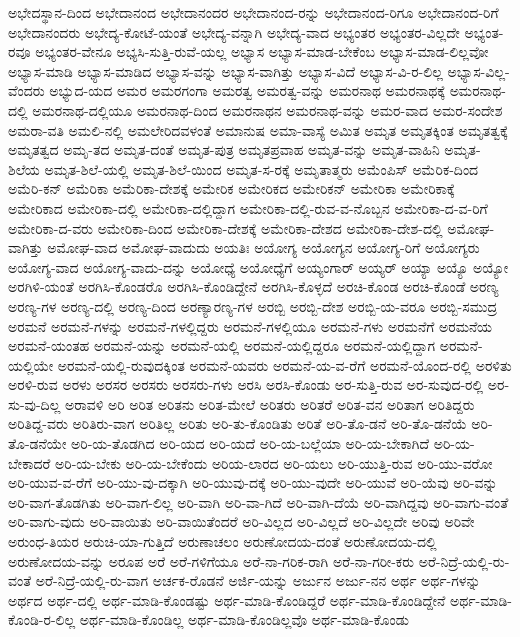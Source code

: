 {ಅಭೇದಸ್ಥಾನ-ದಿಂದ
ಅಭೇದಾನಂದ
ಅಭೇದಾನಂದರ
ಅಭೇದಾನಂದ-ರನ್ನು
ಅಭೇದಾನಂದ-ರಿಗೂ
ಅಭೇದಾನಂದ-ರಿಗೆ
ಅಭೇದಾನಂದರು
ಅಭೇದ್ಯ-ಕೋಟೆ-ಯಂತೆ
ಅಭೇದ್ಯ-ವನ್ನಾಗಿ
ಅಭೇದ್ಯ-ವಾದ
ಅಭ್ಯಂತರ
ಅಭ್ಯಂತರ-ವಿಲ್ಲದೇ
ಅಭ್ಯಂತ-ರವೂ
ಅಭ್ಯಂತರ-ವೇನೂ
ಅಭ್ಯಸಿ-ಸುತ್ತಿ-ರುವೆ-ಯಲ್ಲ
ಅಭ್ಯಾಸ
ಅಭ್ಯಾಸ-ಮಾಡ-ಬೇಕೆಂಬ
ಅಭ್ಯಾಸ-ಮಾಡ-ಲಿಲ್ಲವೋ
ಅಭ್ಯಾಸ-ಮಾಡಿ
ಅಭ್ಯಾಸ-ಮಾಡಿದ
ಅಭ್ಯಾಸ-ವನ್ನು
ಅಭ್ಯಾಸ-ವಾಗಿತ್ತು
ಅಭ್ಯಾಸ-ವಿದೆ
ಅಭ್ಯಾಸ-ವಿ-ರ-ಲಿಲ್ಲ
ಅಭ್ಯಾಸ-ವಿಲ್ಲ-ವೆಂದರು
ಅಭ್ಯುದ-ಯದ
ಅಮರ
ಅಮರಗಂಗಾ
ಅಮರತ್ವ
ಅಮರತ್ವ-ವನ್ನು
ಅಮರನಾಥ
ಅಮರನಾಥಕ್ಕೆ
ಅಮರನಾಥ-ದಲ್ಲಿ
ಅಮರನಾಥ-ದಲ್ಲಿಯೂ
ಅಮರನಾಥ-ದಿಂದ
ಅಮರನಾಥನ
ಅಮರನಾಥ-ವನ್ನು
ಅಮರ-ವಾದ
ಅಮರ-ಸಂದೇಶ
ಅಮರಾ-ವತಿ
ಅಮಲಿ-ನಲ್ಲಿ
ಅಮಲೇರಿದವಳಂತೆ
ಅಮಾನುಷ
ಅಮಾ-ವಾಸ್ಯೆ
ಅಮಿತ
ಅಮೃತ
ಅಮೃತಕ್ಕಿಂತ
ಅಮೃತತ್ವಕ್ಕೆ
ಅಮೃತತ್ವದ
ಅಮೃ-ತದ
ಅಮೃತ-ದಂತೆ
ಅಮೃತ-ಪುತ್ರ
ಅಮೃತಪ್ರವಾಹ
ಅಮೃತ-ವನ್ನು
ಅಮೃತ-ವಾಹಿನಿ
ಅಮೃತ-ಶಿಲೆಯ
ಅಮೃತ-ಶಿಲೆ-ಯಲ್ಲಿ
ಅಮೃತ-ಶಿಲೆ-ಯಿಂದ
ಅಮೃತ-ಸ-ರಕ್ಕೆ
ಅಮೃತಾತ್ಮರು
ಅಮೆಂಪಿಸ್
ಅಮೆರಿಕ-ದಿಂದ
ಅಮೆರಿ-ಕನ್
ಅಮೆರಿಕಾ
ಅಮೆರಿಕಾ-ದೇಶಕ್ಕೆ
ಅಮೇರಿಕ
ಅಮೇರಿಕದ
ಅಮೇರಿಕನ್
ಅಮೇರಿಕಾ
ಅಮೇರಿಕಾಕ್ಕೆ
ಅಮೇರಿಕಾದ
ಅಮೇರಿಕಾ-ದಲ್ಲಿ
ಅಮೇರಿಕಾ-ದಲ್ಲಿದ್ದಾಗ
ಅಮೇರಿಕಾ-ದಲ್ಲಿ-ರುವ-ವ-ನೊಬ್ಬನ
ಅಮೇರಿಕಾ-ದ-ವ-ರಿಗೆ
ಅಮೇರಿಕಾ-ದ-ವರು
ಅಮೇರಿಕಾ-ದಿಂದ
ಅಮೇರಿಕಾ-ದೇಶಕ್ಕೆ
ಅಮೇರಿಕಾ-ದೇಶದ
ಅಮೇರಿಕಾ-ದೇಶ-ದಲ್ಲಿ
ಅಮೋಘ-ವಾಗಿತ್ತು
ಅಮೋಘ-ವಾದ
ಅಮೋಘ-ವಾದುದು
ಅಯತಿಃ
ಅಯೋಗ್ಯ
ಅಯೋಗ್ಯನ
ಅಯೋಗ್ಯ-ರಿಗೆ
ಅಯೋಗ್ಯರು
ಅಯೋಗ್ಯ-ವಾದ
ಅಯೋಗ್ಯ-ವಾದು-ದನ್ನು
ಅಯೋಧ್ಯೆ
ಅಯೋಧ್ಯೆಗೆ
ಅಯ್ಯಂಗಾರ್
ಅಯ್ಯರ್
ಅಯ್ಯಾ
ಅಯ್ಯೊ
ಅಯ್ಯೋ
ಅರಗಿಳಿ-ಯಂತೆ
ಅರಗಿಸಿ-ಕೊಂಡರೊ
ಅರಗಿಸಿ-ಕೊಂಡಿದ್ದೇನೆ
ಅರಗಿಸಿ-ಕೊಳ್ಳದೆ
ಅರಚಿ-ಕೊಂಡ
ಅರಚಿ-ಕೊಂಡೆ
ಅರಣ್ಯ
ಅರಣ್ಯ-ಗಳ
ಅರಣ್ಯ-ದಲ್ಲಿ
ಅರಣ್ಯ-ದಿಂದ
ಅರಣ್ಯಾರಣ್ಯ-ಗಳ
ಅರಬ್ಬಿ
ಅರಬ್ಬಿ-ದೇಶ
ಅರಬ್ಬಿ-ಯ-ವರೂ
ಅರಬ್ಬಿ-ಸಮುದ್ರ
ಅರಮನೆ
ಅರಮನೆ-ಗಳನ್ನು
ಅರಮನೆ-ಗಳಲ್ಲಿದ್ದರು
ಅರಮನೆ-ಗಳಲ್ಲಿಯೂ
ಅರಮನೆ-ಗಳು
ಅರಮನೆಗೆ
ಅರಮನೆಯ
ಅರಮನೆ-ಯಂತಹ
ಅರಮನೆ-ಯನ್ನು
ಅರಮನೆ-ಯಲ್ಲಿ
ಅರಮನೆ-ಯಲ್ಲಿದ್ದರೂ
ಅರಮನೆ-ಯಲ್ಲಿದ್ದಾಗ
ಅರಮನೆ-ಯಲ್ಲಿಯೇ
ಅರಮನೆ-ಯಲ್ಲಿ-ರುವುದಕ್ಕಿಂತ
ಅರಮನೆ-ಯವರು
ಅರಮನೆ-ಯ-ವ-ರೆಗೆ
ಅರಮನೆ-ಯೊಂದ-ರಲ್ಲಿ
ಅರಳಿತು
ಅರಳಿ-ರುವ
ಅರಳು
ಅರಸರ
ಅರಸರು
ಅರಸರು-ಗಳು
ಅರಸಿ
ಅರಸಿ-ಕೊಂಡು
ಅರ-ಸುತ್ತಿ-ರುವ
ಅರ-ಸುವುದ-ರಲ್ಲಿ
ಅರ-ಸು-ವು-ದಿಲ್ಲ
ಅರಾವಳಿ
ಅರಿ
ಅರಿತ
ಅರಿತನು
ಅರಿತ-ಮೇಲೆ
ಅರಿತರು
ಅರಿತರೆ
ಅರಿತ-ವನ
ಅರಿತಾಗ
ಅರಿತಿದ್ದರು
ಅರಿತಿದ್ದ-ವರು
ಅರಿತಿರು-ವಾಗ
ಅರಿತಿಲ್ಲ
ಅರಿತು
ಅರಿ-ತು-ಕೊಂಡಿತು
ಅರಿತೆ
ಅರಿ-ತೊ-ಡನೆ
ಅರಿ-ತೊ-ಡನೆಯೆ
ಅರಿ-ತೊ-ಡನೆಯೇ
ಅರಿ-ಯ-ತೊಡಗಿದ
ಅರಿ-ಯದ
ಅರಿ-ಯದೆ
ಅರಿ-ಯ-ಬಲ್ಲೆಯಾ
ಅರಿ-ಯ-ಬೇಕಾಗಿದೆ
ಅರಿ-ಯ-ಬೇಕಾದರೆ
ಅರಿ-ಯ-ಬೇಕು
ಅರಿ-ಯ-ಬೇಕೆಂದು
ಅರಿಯ-ಲಾರದ
ಅರಿ-ಯಲು
ಅರಿ-ಯುತ್ತಿ-ರುವ
ಅರಿ-ಯು-ವರೋ
ಅರಿ-ಯುವ-ವ-ರೆಗೆ
ಅರಿ-ಯು-ವು-ದಕ್ಕಾಗಿ
ಅರಿ-ಯುವು-ದಕ್ಕೆ
ಅರಿ-ಯು-ವುದೇ
ಅರಿ-ಯುವೆ
ಅರಿ-ಯೆವು
ಅರಿ-ವನ್ನು
ಅರಿ-ವಾಗ-ತೊಡಗಿತು
ಅರಿ-ವಾಗ-ಲಿಲ್ಲ
ಅರಿ-ವಾಗಿ
ಅರಿ-ವಾ-ಗಿದೆ
ಅರಿ-ವಾಗಿ-ದೆಯೆ
ಅರಿ-ವಾಗಿದ್ದವು
ಅರಿ-ವಾಗು-ವಂತೆ
ಅರಿ-ವಾಗು-ವುದು
ಅರಿ-ವಾಯಿತು
ಅರಿ-ವಾಯಿತೆಂದರೆ
ಅರಿ-ವಿಲ್ಲದ
ಅರಿ-ವಿಲ್ಲದೆ
ಅರಿ-ವಿಲ್ಲದೇ
ಅರಿವು
ಅರಿವೇ
ಅರುಂಧ-ತಿಯರ
ಅರುಚಿ-ಯಾ-ಗುತ್ತಿದೆ
ಅರುಣಾಚಲಂ
ಅರುಣೋದಯ-ದಂತೆ
ಅರುಣೋದಯ-ದಲ್ಲಿ
ಅರುಣೋದಯ-ವನ್ನು
ಅರೂಪ
ಅರೆ
ಅರೆ-ಗಳಿಗೆಯೂ
ಅರೆ-ನಾ-ಗರಿಕ-ರಾಗಿ
ಅರೆ-ನಾ-ಗರೀ-ಕರು
ಅರೆ-ನಿದ್ರೆ-ಯಲ್ಲಿ-ರು-ವಂತೆ
ಅರೆ-ನಿದ್ರೆ-ಯಲ್ಲಿ-ರು-ವಾಗ
ಅರ್ಚಕ-ರೊಡನೆ
ಅರ್ಜಿ-ಯನ್ನು
ಅರ್ಜುನ
ಅರ್ಜು-ನನ
ಅರ್ಥ
ಅರ್ಥ-ಗಳನ್ನು
ಅರ್ಥದ
ಅರ್ಥ-ದಲ್ಲಿ
ಅರ್ಥ-ಮಾಡಿ-ಕೊಂಡಷ್ಟು
ಅರ್ಥ-ಮಾಡಿ-ಕೊಂಡಿದ್ದರೆ
ಅರ್ಥ-ಮಾಡಿ-ಕೊಂಡಿದ್ದೇನೆ
ಅರ್ಥ-ಮಾಡಿ-ಕೊಂಡಿ-ರ-ಲಿಲ್ಲ
ಅರ್ಥ-ಮಾಡಿ-ಕೊಂಡಿಲ್ಲ
ಅರ್ಥ-ಮಾಡಿ-ಕೊಂಡಿಲ್ಲವೊ
ಅರ್ಥ-ಮಾಡಿ-ಕೊಂಡು
}
